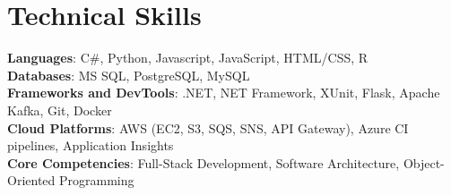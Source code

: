 \documentclass[letterpaper,11pt]{article}
\begin{document}
\section{Technical Skills}
 \begin{itemize}[leftmargin=0.15in, label={}]
    \small{\item{
     \textbf{Languages}{: C\#, Python, Javascript, JavaScript, HTML/CSS, R} \\
     \textbf{Databases}{: MS SQL, PostgreSQL, MySQL} \\
     \textbf{Frameworks and DevTools}{: .NET, NET Framework, XUnit, Flask, Apache Kafka, Git, Docker} \\
     \textbf{Cloud Platforms}{: AWS (EC2, S3, SQS, SNS, API Gateway), Azure CI pipelines, Application Insights} \\
     \textbf{Core Competencies}{: Full-Stack Development, Software Architecture, Object-Oriented Programming}
    }}
 \end{itemize}


\end{document}
